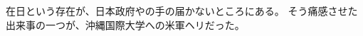 \documentclass[12pt]{article}
\begin{document}
\begin{CJK}{UTF8}{ipxm}
    在日という存在が、日本政府やの手の届かないところにある。
    そう痛感させた出来事の一つが、沖縄国際大学への米軍ヘリだった。
    
\end{CJK}
\end{document}
